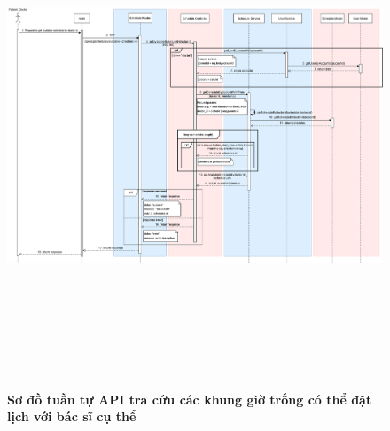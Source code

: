 \begin{figure}[H]
	\centering
	\includegraphics[width=15cm,height=15cm]{Images/api_sequence/schedule/getAvailableScheduleByDoctorId.drawio.png}
	\caption[Sơ đồ tuần tự API tra cứu các khung giờ trống có thể đặt lịch với bác sĩ cụ thể]{\bfseries \fontsize{12pt}{0pt}\selectfont Sơ đồ tuần tự API tra cứu các khung giờ trống có thể đặt lịch với bác sĩ cụ thể}
	\label{sequence_diagram_get_available_by_doctor}
\end{figure}


